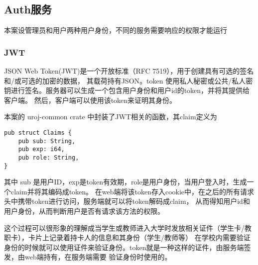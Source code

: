 \subsection{Auth服务}
本案设管理员和用户两种用户身份，不同的服务需要响应的权限才能运行
\subsubsection{JWT}
JSON Web Token(JWT)是一个开放标准（RFC 7519），用于创建具有可选的签名和/或可选的加密的数据，
其载荷持有JSON。token 使用私人秘密或公共/私人密钥进行签名。服务器可以生成一个包含用户身份和用户id的token，并将其提供给客户端。
然后，客户端可以使用该token来证明其身份。

本案的 uroj-common crate 中封装了JWT相关的函数，其claim定义为
\begin{lstlisting}
pub struct Claims {
    pub sub: String,
    pub exp: i64,
    pub role: String,
}
\end{lstlisting}

其中 sub 是用户ID，exp是token有效期，role是用户身份，当用户登入时，生成一个claim并将其编码成token。
在web端将该token存入cookie中，在之后的所有请求头中携带token进行访问，服务端就可以将token解码成claim，
从而得知用户id和用户身份，从而判断用户是否有请求该方法的权限。

这个过程可以很形象的理解成当学生或教师进入大学时发放相关证件（学生卡/教职卡），卡片上记录着持卡人的信息和其身份（学生/教师等）
在学校内需要验证身份的时候就可以使用证件来验证身份。token就是一种这样的证件，由服务端签发，由web端持有，在服务端需要
验证身份时使用的。